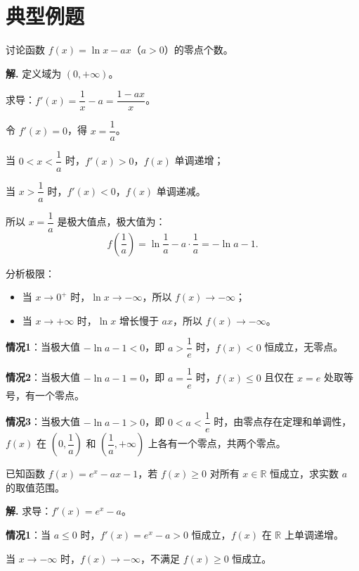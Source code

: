 \documentclass[11pt]{ctexrep}
\begin{document}
\section*{典型例题}

\begin{example}[函数零点个数问题]
    讨论函数 $f(x) = \ln x - ax$（$a > 0$）的零点个数。
\end{example}

\textbf{解.} 定义域为 $(0, +\infty)$。

求导：$f'(x) = \dfrac{1}{x} - a = \dfrac{1 - ax}{x}$。

令 $f'(x) = 0$，得 $x = \dfrac{1}{a}$。

当 $0 < x < \dfrac{1}{a}$ 时，$f'(x) > 0$，$f(x)$ 单调递增；

当 $x > \dfrac{1}{a}$ 时，$f'(x) < 0$，$f(x)$ 单调递减。

所以 $x = \dfrac{1}{a}$ 是极大值点，极大值为：
\[
    f\left(\frac{1}{a}\right) = \ln\frac{1}{a} - a \cdot \frac{1}{a} = -\ln a - 1.
\]

分析极限：
\begin{itemize}
    \item 当 $x \to 0^+$ 时，$\ln x \to -\infty$，所以 $f(x) \to -\infty$；
    \item 当 $x \to +\infty$ 时，$\ln x$ 增长慢于 $ax$，所以 $f(x) \to -\infty$。
\end{itemize}

\textbf{情况1}：当极大值 $-\ln a - 1 < 0$，即 $a > \dfrac{1}{e}$ 时，$f(x) < 0$ 恒成立，无零点。

\textbf{情况2}：当极大值 $-\ln a - 1 = 0$，即 $a = \dfrac{1}{e}$ 时，$f(x) \le 0$ 且仅在 $x = e$ 处取等号，有一个零点。

\textbf{情况3}：当极大值 $-\ln a - 1 > 0$，即 $0 < a < \dfrac{1}{e}$ 时，由零点存在定理和单调性，$f(x)$ 在 $\left(0, \dfrac{1}{a}\right)$ 和 $\left(\dfrac{1}{a}, +\infty\right)$ 上各有一个零点，共两个零点。

\begin{example}[不等式恒成立问题]
    已知函数 $f(x) = e^x - ax - 1$，若 $f(x) \ge 0$ 对所有 $x \in \mathbb{R}$ 恒成立，求实数 $a$ 的取值范围。
\end{example}

\textbf{解.} 求导：$f'(x) = e^x - a$。

\textbf{情况1}：当 $a \le 0$ 时，$f'(x) = e^x - a > 0$ 恒成立，$f(x)$ 在 $\mathbb{R}$ 上单调递增。

当 $x \to -\infty$ 时，$f(x) \to -\infty$，不满足 $f(x) \ge 0$ 恒成立。
\end{document}
